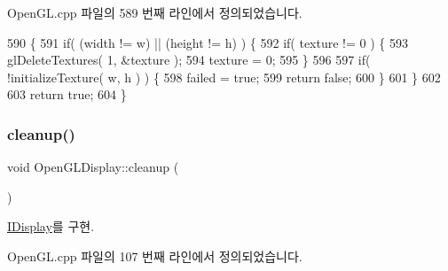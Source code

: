 Open\+G\+L.\+cpp 파일의 589 번째 라인에서 정의되었습니다.


\begin{DoxyCode}
590 \{
591     \textcolor{keywordflow}{if}( (width != w) || (height != h) ) \{
592         \textcolor{keywordflow}{if}( texture != 0 ) \{
593             glDeleteTextures( 1, &texture );
594             texture = 0;
595         \}
596         
597         \textcolor{keywordflow}{if}( !initializeTexture( w, h ) ) \{
598             failed = \textcolor{keyword}{true};
599             \textcolor{keywordflow}{return} \textcolor{keyword}{false};
600         \}
601     \}
602     
603     \textcolor{keywordflow}{return} \textcolor{keyword}{true};
604 \}
\end{DoxyCode}
\mbox{\label{class_open_g_l_display_a870bdc3cf12a50ff23755e1869f9026e}} 
\subsubsection{\texorpdfstring{cleanup()}{cleanup()}}
{\footnotesize\ttfamily void Open\+G\+L\+Display\+::cleanup (\begin{DoxyParamCaption}{ }\end{DoxyParamCaption})\hspace{0.3cm}{\ttfamily [virtual]}}



\mbox{\hyperlink{class_i_display_a039e8c6b3f8fbee485fb895ef70e72c0}{I\+Display}}를 구현.



Open\+G\+L.\+cpp 파일의 107 번째 라인에서 정의되었습니다.



